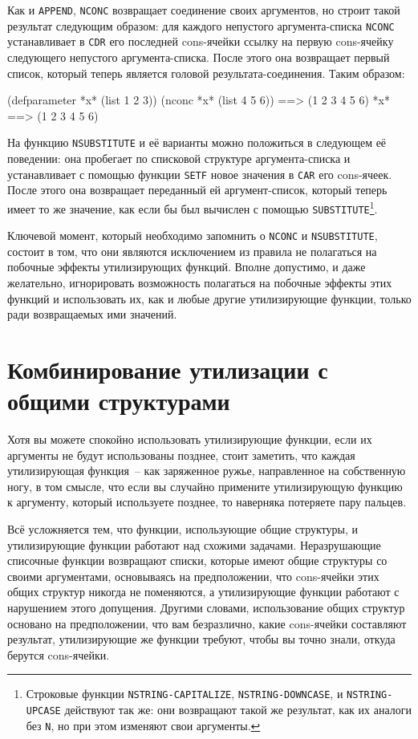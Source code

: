 Как и \lstinline{APPEND}, \lstinline{NCONC} возвращает соединение своих аргументов, но строит такой
результат следующим образом: для каждого непустого аргумента-списка \lstinline{NCONC}
устанавливает в \lstinline{CDR} его последней cons-ячейки ссылку на первую cons-ячейку
следующего непустого аргумента-списка. После этого она возвращает первый список, который
теперь является головой результата-соединения. Таким образом:

\begin{myverb}
(defparameter *x* (list 1 2 3))
(nconc *x* (list 4 5 6)) ==> (1 2 3 4 5 6)
*x*                      ==> (1 2 3 4 5 6)
\end{myverb}

На функцию \lstinline{NSUBSTITUTE} и её варианты можно положиться в следующем её поведении: она
пробегает по списковой структуре аргумента-списка и устанавливает с помощью функции
\lstinline{SETF} новое значения в \lstinline{CAR} его cons-ячеек. После этого она возвращает
переданный ей аргумент-список, который теперь имеет то же значение, как если бы был
вычислен с помощью \lstinline{SUBSTITUTE}\footnote{Строковые функции
  \lstinline{NSTRING-CAPITALIZE}, \lstinline{NSTRING-DOWNCASE}, и \lstinline{NSTRING-UPCASE} действуют
  так же: они возвращают такой же результат, как их аналоги без \lstinline{N}, но при этом
  изменяют свои аргументы.}.

Ключевой момент, который необходимо запомнить о \lstinline{NCONC} и \lstinline{NSUBSTITUTE}, состоит
в том, что они являются исключением из правила не полагаться на побочные эффекты
утилизирующих функций. Вполне допустимо, и даже желательно, игнорировать возможность
полагаться на побочные эффекты этих функций и использовать их, как и любые другие
утилизирующие функции, только ради возвращаемых ими значений.

\section{Комбинирование утилизации с общими структурами}

Хотя вы можете спокойно использовать утилизирующие функции, если их аргументы не будут
использованы позднее, стоит заметить, что каждая утилизирующая функция~-- как заряженное
ружье, направленное на собственную ногу, в том смысле, что если вы случайно примените
утилизирующую функцию к аргументу, который используете позднее, то наверняка потеряете
пару пальцев.

Всё усложняется тем, что функции, использующие общие структуры, и утилизирующие функции
работают над схожими задачами. Неразрушающие списочные функции возвращают списки,
которые имеют общие структуры со своими аргументами, основываясь на предположении, что
cons-ячейки этих общих структур никогда не поменяются, а утилизирующие функции работают с
нарушением этого допущения. Другими словами, использование общих структур основано на
предположении, что вам безразлично, какие cons-ячейки составляют результат, утилизирующие
же функции требуют, чтобы вы точно знали, откуда берутся cons-ячейки.

